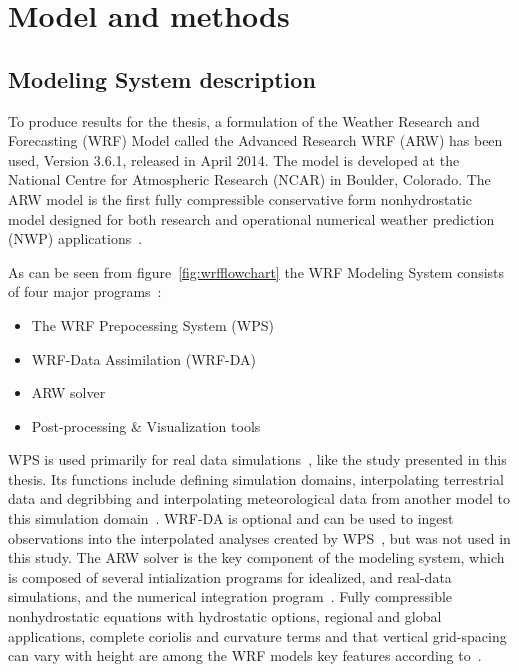 \chapter{Model and methods}
\label{chap:modmet}
\section{Modeling System description}
\label{sec:modeldes}

To produce results for the thesis, a formulation of the Weather Research and Forecasting (WRF) Model called the Advanced Research WRF (ARW) has been used, Version 3.6.1, released in April 2014. The model is developed at the National Centre for Atmospheric Research (NCAR) in Boulder, Colorado. The ARW model is the first fully compressible conservative form nonhydrostatic model designed for both research and operational numerical weather prediction (NWP) applications~\citep{Skamarock2008}. 

As can be seen from figure~\ref{fig:wrfflowchart} the WRF Modeling System consists of four major programs~\citep{Wang2015}:
\begin{itemize}
\item The WRF Prepocessing System (WPS)
\item WRF-Data Assimilation (WRF-DA)
\item ARW solver
\item Post-processing \& Visualization tools
\end{itemize}

WPS is used primarily for real data simulations~\citep{Wang2015}, like the study presented in this thesis. Its functions include defining simulation domains, interpolating terrestrial data and degribbing and interpolating meteorological data from another model to this simulation domain~\citep{Wang2015}. WRF-DA is optional and can be used to ingest observations into the interpolated analyses created by WPS~\citep{Wang2015}, but was not used in this study. The ARW solver is the key component of the modeling system, which is composed of several intialization programs for idealized, and real-data simulations, and the numerical integration program~\citep{Wang2015}. Fully compressible nonhydrostatic equations with hydrostatic options, regional and global applications, complete coriolis and curvature terms and that vertical grid-spacing can vary with height are among the WRF models key features according to~\citet{Wang2015}.

